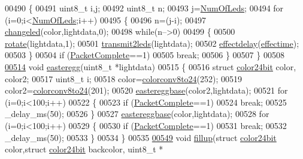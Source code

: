 \begin{DoxyCode}
00490 \{
00491     uint8\_t i,j;
00492     uint8\_t n;
00493     j=\hyperlink{globals_8h_ad5db4045aed262ed4aae2af9d81fab98}{NumOfLeds};
00494     \textcolor{keywordflow}{for} (i=0;i<\hyperlink{globals_8h_ad5db4045aed262ed4aae2af9d81fab98}{NumOfLeds};i++)
00495     \{
00496         n=(j-i);
00497         \hyperlink{_lightstribe_8c_a63fa595d401f0e85c1bba55ba2b1d66e}{changeled}(color,lightdata,0);
00498         \textcolor{keywordflow}{while}(n-->0)
00499         \{
00500             \hyperlink{_led_effects_8c_afd64325b08e785d37b4dfaf358e517f0}{rotate}(lightdata,1);
00501             \hyperlink{_lightstribe_8c_aac724dad670e4a26723daf71ce6a8d8a}{transmit2leds}(lightdata);
00502             \hyperlink{_led_effects_8c_a6950e7657ba74d0d490ba36427533c4b}{effectdelay}(\hyperlink{globals_8h_ac2445d316b2972d381edeac44bb6a226}{effectime});
00503         \}
00504         \textcolor{keywordflow}{if} (\hyperlink{globals_8h_a1b09d1a5bcf4c8ab435bb3c9e36def59}{PacketComplete}==1)
00505         \textcolor{keywordflow}{break};
00506     \}
00507 \}
00508 
\hypertarget{_led_effects_8c_source_l00514}{}\hyperlink{_led_effects_8h_a25e09bcb1481b20ebc2a27e7098b5115}{00514} \textcolor{keywordtype}{void} \hyperlink{_led_effects_8c_a25e09bcb1481b20ebc2a27e7098b5115}{easteregg}(uint8\_t *lightdata)
00515 \{
00516     \textcolor{keyword}{struct }\hyperlink{structcolor24bit}{color24bit} color, color2;
00517     uint8\_t i;
00518     color=\hyperlink{_led_effects_8c_a55291315ab0f2ca8d508f0e9da1920a7}{colorconv8to24}(252);
00519     color2=\hyperlink{_led_effects_8c_a55291315ab0f2ca8d508f0e9da1920a7}{colorconv8to24}(201);
00520     \hyperlink{_led_effects_8c_ac83bd19da7ebd3c475e3667e4229db41}{eastereggbase}(color2,lightdata);
00521     \textcolor{keywordflow}{for} (i=0;i<100;i++)
00522     \{
00523         \textcolor{keywordflow}{if} (\hyperlink{globals_8h_a1b09d1a5bcf4c8ab435bb3c9e36def59}{PacketComplete}==1)
00524         \textcolor{keywordflow}{break};
00525         \_delay\_ms(50);
00526     \}
00527     \hyperlink{_led_effects_8c_ac83bd19da7ebd3c475e3667e4229db41}{eastereggbase}(color,lightdata);
00528     \textcolor{keywordflow}{for} (i=0;i<100;i++)
00529     \{
00530         \textcolor{keywordflow}{if} (\hyperlink{globals_8h_a1b09d1a5bcf4c8ab435bb3c9e36def59}{PacketComplete}==1)
00531         \textcolor{keywordflow}{break};
00532         \_delay\_ms(50);
00533     \}
00534 \}
00535 
\hypertarget{_led_effects_8c_source_l00549}{}\hyperlink{_led_effects_8h_a99174e2b381d7ec6667d29352e6eca1b}{00549} \textcolor{keywordtype}{void} \hyperlink{_led_effects_8c_a99174e2b381d7ec6667d29352e6eca1b}{fillup}(\textcolor{keyword}{struct} \hyperlink{structcolor24bit}{color24bit} color,\textcolor{keyword}{struct} \hyperlink{structcolor24bit}{color24bit} backcolor, uint8\_t *

\end{DoxyCode}
